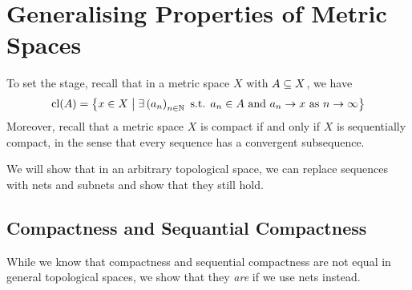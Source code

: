 \section{Generalising Properties of Metric Spaces}

To set the stage, recall that in a metric space $X$ with $A \subseteq X$, we have
\begin{align*}
    \operatorname{cl}(A) = \left\{ x \in X \; \middle\vert \; \exists \left( a_n \right)_{n \in \mathbb{N}} \text{ s.t. } a_n \in A \text{ and } a_n \to x \text{ as } n \to \infty \right\}
\end{align*}
Moreover, recall that a metric space $X$ is compact if and only if $X$ is sequentially compact, in the sense that every sequence has a convergent subsequence.

We will show that in an arbitrary topological space, we can replace sequences with nets and subnets and show that they still hold.

\subsection{Compactness and Sequantial Compactness}

While we know that compactness and sequential compactness are not equal in general topological spaces, we show that they \textit{are} if we use nets instead.

